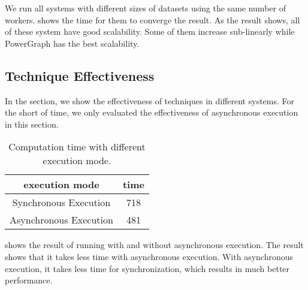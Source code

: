 We run all systems with different sizes of datasets using
the same number of workers.  shows the time
for them to converge the result. As the result shows,
all of these system have good scalability. Some of them increase
sub-linearly while PowerGraph has the best scalability.


\subsection{Technique Effectiveness} \label{subsec:technique}
In the section, we show the effectiveness of techniques in
different systems. For the short of time, we only evaluated
the effectiveness of asynchronous execution in this section.

\begin{table}
  \center
  \begin{tabular}{c|c}
    \hline
    \textbf{execution mode} & \textbf{time} \\
    \hline
    Synchronous Execution & 718 \\
    \hline
    Asynchronous Execution & 481
  \end{tabular}
  \caption{Computation time with different execution mode.}
  \label{tab:asyn}

\end{table}

 shows the result of running with and without asynchronous
execution. The result shows that it takes less time with asynchronous
execution. With asynchronous execution, it takes less time for synchronization,
which results in much better performance.

